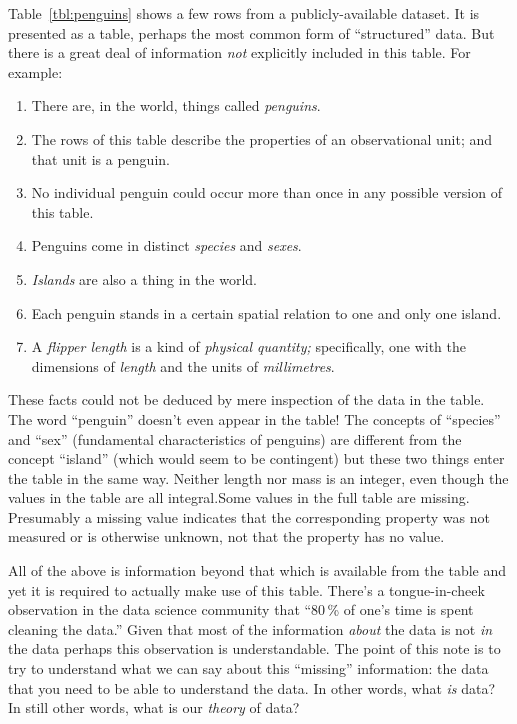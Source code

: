 \documentclass[10pt, a4paper, twocolumn]{article}
\begin{document}
Table~\ref{tbl:penguins} shows a few rows from a publicly-available dataset. It
is presented as a table, perhaps the most common form of ``structured'' data. But
there is a great deal of information \emph{not} explicitly included in this
table. For example:
\begin{enumerate}
\item{There are, in the world, things called \emph{penguins}.}
\item{The rows of this table describe the properties of an observational unit;
  and that unit is a penguin.}
\item{No individual penguin could occur more than once in any possible version
  of this table.}
\item{Penguins come in distinct \emph{species} and \emph{sexes}.}
\item{\emph{Islands} are also a thing in the world.}
\item{Each penguin stands in a certain spatial relation to one and only one
  island.}
\item{A \emph{flipper length} is a kind of \emph{physical quantity;} specifically, one
  with the dimensions of \emph{length} and the units of \emph{millimetres}.}
 \end{enumerate}
These facts could not be deduced by mere inspection of the data in the
table. The word ``penguin'' doesn't even appear in the table! The concepts of
``species'' and ``sex'' (fundamental characteristics of penguins) are different
from the concept ``island'' (which would seem to be contingent) but these two
things enter the table in the same way. Neither length nor mass is an integer,
even though the values in the table are all integral.Some values in the full
table are missing. Presumably a missing value indicates that the corresponding
property was not measured or is otherwise unknown, not that the property has no
value.

All of the above is information beyond that which is available from the table
and yet it is required to actually make use of this table. There's a
tongue-in-cheek observation in the data science community that ``80\,\% of one's
time is spent cleaning the data.'' Given that most of the information
\emph{about} the data is not \emph{in} the data perhaps this observation is
understandable. The point of this note is to try to understand what we can say
about this ``missing'' information: the data that you need to be able to
understand the data. In other words, what \emph{is} data? In still other words,
what is our \emph{theory} of data?
\end{document}
